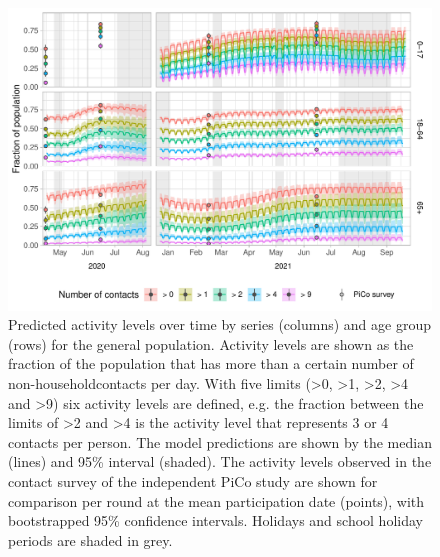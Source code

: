 \documentclass[fleqn,10pt]{wlscirep}
\begin{document}
\clearpage

\begin{figure}[ht]
\centering
\includegraphics[width=\linewidth]{../figures/prediction_generalpopulation_cat6.pdf}
\caption{Predicted activity levels over time by series (columns) and age group (rows) for the general population. Activity levels are shown as the fraction of the population that has more than a certain number of non-householdcontacts per day. With five limits (>0, >1, >2, >4 and >9) six activity levels are defined, e.g. the fraction between the limits of >2 and >4 is the activity level that represents 3 or 4 contacts per person. The model predictions are shown by the median (lines) and 95\% interval (shaded). The activity levels observed in the contact survey of the independent PiCo study are shown for comparison per round at the mean participation date (points), with bootstrapped 95\% confidence intervals. Holidays and school holiday periods are shaded in grey.}
\label{fig:genpop}
\end{figure}

\clearpage
\end{document}
